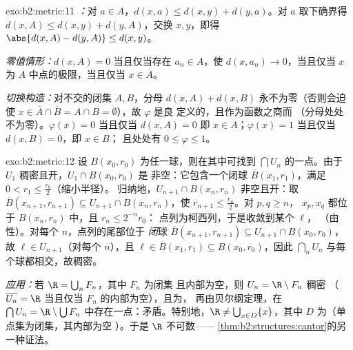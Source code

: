 \begin{solution}{exo:b2:metric:11}
\emph{：}对 $a \in A$，$d(x, a) \leq d(x, y) + d(y,
a)$。对 $a$ 取下确界得 $d(x, A) \leq d(x, y) + d(y,
A)$，交换 $x, y$，即得 $\abs{d(x,A) - d(y,A)} \leq d(x,y)$。

\emph{零值情形：}$d(x, A) = 0$ 当且仅当存在 $a_n \in A$，使
$d(x, a_n) \to 0$，当且仅当 $x$ 为 $A$ 中点的极限，当且仅当 $x \in
\overline A$。

\emph{切换构造：}对不交的闭集 $A, B$，分母
$d(x,A) + d(x,B)$ 永不为零（否则会迫使 $x \in \overline
A \cap \overline B = A \cap B = \emptyset$），故 $\varphi$ 是良
定义的，且作为函数之商而
（分母处处不为零）。$\varphi(x) = 0$ 当且仅当 $d(x, A) = 0$
即 $x \in A$；$\varphi(x) = 1$ 当且仅当 $d(x, B) = 0$，即 $x \in B$；
且处处有 $0 \leq \varphi \leq 1$。
\end{solution}

\begin{solution}{exo:b2:metric:12}
设 $B(x_0, r_0)$ 为任一球，则在其中可找到 $\bigcap U_n$
的一点。由于 $U_1$ 稠密且开，$U_1 \cap B(x_0, r_0)$ 是
非空：它包含一个闭球 $\overline B(x_1,
r_1)$，满足 $0 < r_1 \leq \frac{r_0}2$（缩小半径）。
归纳地，$U_{n+1} \cap B(x_n, r_n)$ 非空且开：取
$\overline B(x_{n+1}, r_{n+1}) \subseteq U_{n+1} \cap B(x_n,
r_n)$，使 $r_{n+1} \leq \frac{r_n}2$。对 $p, q \geq n$，
$x_p, x_q$ 都位于 $B(x_n, r_n)$ 中，且 $r_n \leq 2^{-n}r_0$：
点列为柯西列，于是收敛到某个 $\ell$，
（由性）。对每个 $n$，点列的尾部位于
\emph{闭}球 $\overline B(x_{n+1}, r_{n+1}) \subseteq U_{n+1}
\cap B(x_0, r_0)$，故 $\ell \in U_{n+1}$（对每个 $n$），且 $\ell
\in \overline B(x_1, r_1) \subseteq B(x_0, r_0)$，因此
$\bigcap_n U_n$ 与每个球都相交，故稠密。

\emph{应用：}若 $\R = \bigcup_n F_n$，其中 $F_n$ 为闭集
且内部为空，则 $U_n = \R \setminus F_n$ 稠密
（$\overline{U_n} = \R$ 当且仅当 $F_n$ 的内部为空），且为，
再由贝尔纲定理，在 $\bigcap U_n = \R \setminus \bigcup
F_n$ 中存在一点：矛盾。特别地，$\R \neq \bigcup_{x \in D}
\{x\}$，其中 $D$ 为（单点集为闭集，其内部为空
）。于是 $\R$ 不可数——
\cref{thm:b2:structures:cantor}的另一种证法。
\end{solution}

